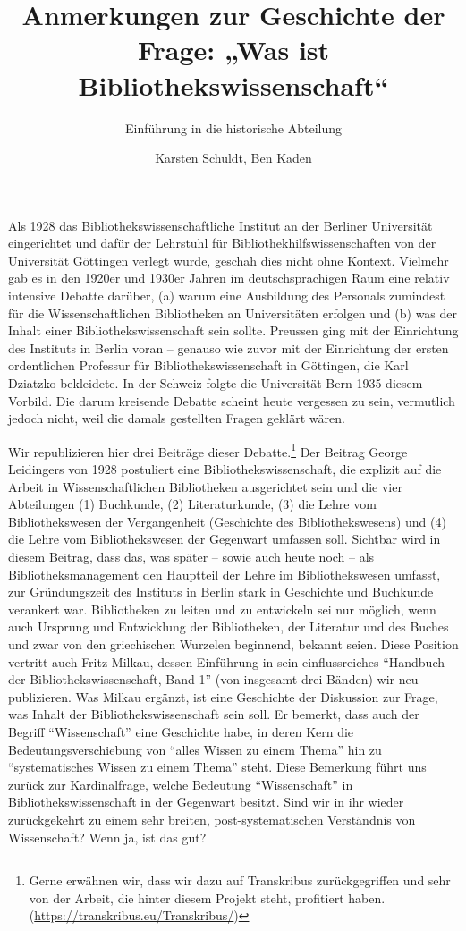 \documentclass[a4paper,
fontsize=11pt,
oneside,
numbers=noperiodatend,
parskip=half-,
bibliography=totoc,
final
]{scrartcl}
\title{\LARGE{Anmerkungen zur Geschichte der Frage: „Was ist Bibliothekswissenschaft“}}%
\subtitle{Einführung in die historische Abteilung}
\author{Karsten Schuldt, Ben Kaden} %
\date{}
\begin{document}
\maketitle
\thispagestyle{fancyplain} 


Als 1928 das Bibliothekswissenschaftliche Institut an der Berliner
Universität eingerichtet und dafür der Lehrstuhl für
Bibliothekhilfswissenschaften von der Universität Göttingen verlegt
wurde, geschah dies nicht ohne Kontext. Vielmehr gab es in den 1920er
und 1930er Jahren im deutschsprachigen Raum eine relativ intensive
Debatte darüber, (a) warum eine Ausbildung des Personals zumindest für
die Wissenschaftlichen Bibliotheken an Universitäten erfolgen und (b)
was der Inhalt einer Bibliothekswissenschaft sein sollte. Preussen ging
mit der Einrichtung des Instituts in Berlin voran -- genauso wie zuvor
mit der Einrichtung der ersten ordentlichen Professur für
Bibliothekswissenschaft in Göttingen, die Karl Dziatzko bekleidete. In
der Schweiz folgte die Universität Bern 1935 diesem Vorbild. Die darum
kreisende Debatte scheint heute vergessen zu sein, vermutlich jedoch
nicht, weil die damals gestellten Fragen geklärt wären.

Wir republizieren hier drei Beiträge dieser Debatte.\footnote{Gerne
  erwähnen wir, dass wir dazu auf Transkribus zurückgegriffen und sehr
  von der Arbeit, die hinter diesem Projekt steht, profitiert haben.
  (\url{https://transkribus.eu/Transkribus/})} Der Beitrag George
Leidingers von 1928 postuliert eine Bibliothekswissenschaft, die
explizit auf die Arbeit in Wissenschaftlichen Bibliotheken ausgerichtet
sein und die vier Abteilungen (1) Buchkunde, (2) Literaturkunde, (3) die
Lehre vom Bibliothekswesen der Vergangenheit (Geschichte des
Bibliothekswesens) und (4) die Lehre vom Bibliothekswesen der Gegenwart
umfassen soll. Sichtbar wird in diesem Beitrag, dass das, was später --
sowie auch heute noch -- als Bibliotheksmanagement den Hauptteil der
Lehre im Bibliothekswesen umfasst, zur Gründungszeit des Instituts in
Berlin stark in Geschichte und Buchkunde verankert war. Bibliotheken zu
leiten und zu entwickeln sei nur möglich, wenn auch Ursprung und
Entwicklung der Bibliotheken, der Literatur und des Buches und zwar von
den griechischen Wurzelen beginnend, bekannt seien. Diese Position
vertritt auch Fritz Milkau, dessen Einführung in sein einflussreiches
\enquote{Handbuch der Bibliothekswissenschaft, Band 1} (von insgesamt
drei Bänden) wir neu publizieren. Was Milkau ergänzt, ist eine
Geschichte der Diskussion zur Frage, was Inhalt der
Bibliothekswissenschaft sein soll. Er bemerkt, dass auch der Begriff
\enquote{Wissenschaft} eine Geschichte habe, in deren Kern die
Bedeutungsverschiebung von \enquote{alles Wissen zu einem Thema} hin zu
\enquote{systematisches Wissen zu einem Thema} steht. Diese Bemerkung
führt uns zurück zur Kardinalfrage, welche Bedeutung
\enquote{Wissenschaft} in Bibliothekswissenschaft in der Gegenwart
besitzt. Sind wir in ihr wieder zurückgekehrt zu einem sehr breiten,
post-systematischen Verständnis von Wissenschaft? Wenn ja, ist das gut?
\end{document}
